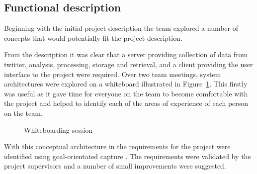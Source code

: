 \subsection{Functional description}
	


Beginning with the initial project description the team explored a number of
concepts that would potentially fit the project description.

From the description it was clear that a server providing collection of data
from twitter, analysis, processing, storage and retrieval, and a client
providing the user interface to the project were required. Over two team
meetings, system architectures were explored on a whiteboard illustrated in
Figure~\ref{fig:whiteboarding_session}. This firstly was useful as it gave time for
everyone on the team to become comfortable with the project and helped to
identify each of the areas of experience of each person on the team.

\begin{figure}[htb]
\centering
\mbox{}

\caption{Whiteboarding session}
\label{fig:whiteboarding_session}
\end{figure}

With this conceptual architecture in the requirements for the project were
identified using goal-orientated capture \cite{dardenne93}. The requirements were validated by
the project supervisors and a number of small improvements were suggested.

